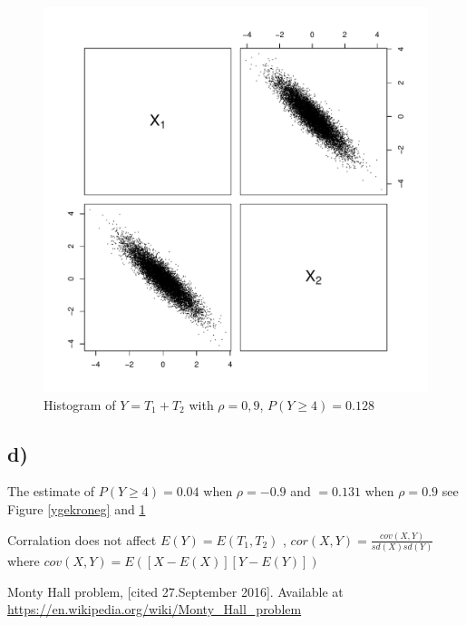 \documentclass[a4paper, 11pt]{article}
\begin{document}
\begin{figure}[H]
  \centering
  \includegraphics[scale=0.7,page=8]{Rplots4.pdf}
  \caption{Histogram of $Y=T_1 + T_2$ with $\rho = 0,9$, $P(Y\geq4) = 0.128$}
  \label{ygekropos}
\end{figure}

\subsection*{d)}
The estimate of $P(Y\geq4) = 0.04$ when $\rho = -0.9$ and $=0.131$ when $\rho = 0.9$ see Figure \ref{ygekroneg} and \ref{ygekropos}

Corralation does not affect $E(Y) = E(T_1,T_2)$ , $cor(X,Y) = \frac{cov(X,Y)}{sd(X)sd(Y)}$ where $cov(X,Y) = E([X-E(X)][Y-E(Y)])$

\begin{thebibliography}{9}
  
  Monty Hall problem, [cited 27.September 2016]. Available at \url{https://en.wikipedia.org/wiki/Monty_Hall_problem}

\end{thebibliography}
\end{document}
